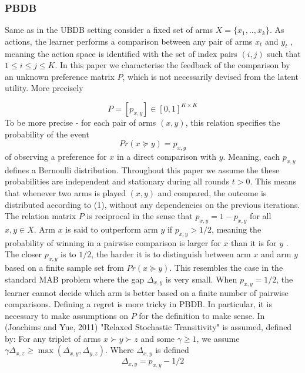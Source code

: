 \documentclass{llncs}
\begin{document}
	\subsubsection{PBDB}	
		Same as in the UBDB setting	consider a fixed set of arms $X = \{x_1,..,x_k\}$. 
		As actions, the learner performs a comparison between any pair of arms $x_t$ and $y_t$ , meaning the action space is identified with the set of index pairs $(i, j)$ such that $1 \leq i \leq j \leq K$. 
		In this paper we characterise the feedback of the comparison by an unknown preference matrix $P$, which is not necessarily devised from the latent utility.
		More precisely
		
		\begin{equation}\label{eq:preference_matrix}
			P = [p_{x,y}] \in [0,1]^{K \times K} 
		\end{equation}
		To be more precise - for each pair of arms $(x ,y)$, this relation specifies the probability of the event
		\begin{equation}\label{eq:p_xy}
			Pr(x \succeq y) = p_{x, y}
		\end{equation}
		of observing a preference for $x$ in a direct comparison with $y$. 
		Meaning, each $p_{x,y}$ defines a Bernoulli distribution.
		Throughout this paper we assume the these probabilities are independent and stationary during all rounds $t > 0$.		
		This means that whenever two arms is played $(x ,y)$ and compared, the outcome is distributed according to (1), without any dependencies on the previous iterations.
		The relation matrix $P$ is reciprocal in the sense that $p_{x,y} = 1-p_{x,y}$ for all $x,y \in X$.		
		Arm $x$ is said to outperform arm $y$ if $p_{x,y} > 1/2$, meaning the probability of winning in a pairwise comparison is larger for $x$ than it is for $y$ . 
		The closer $p_{x,y}$ is to $1/2$, the harder it is to distinguish between arm $x$ and arm $y$ based on a finite sample set from $Pr(x \succeq y)$. This resembles the case in the standard MAB problem where the gap $\Delta_{x,y}$ is very small.
		 When $p_{x,y} = 1/2$, the learner cannot decide which arm is better based on a finite number of pairwise comparisons.
		 Defining a regret is more tricky in PBDB. In particular, it is necessary to make assumptions on $P$ for the definition to make sense.
		 In (Joachims and Yue, 2011) "Relaxed Stochastic Transitivity" is assumed, defined by:
		 For any triplet of arms $x \succ y \succ z$ and some $ \gamma \geq 1 $, 
		 we assume $\gamma \Delta_{x,z} \geq \max(\Delta_{x,y},\Delta_{y,z})$.
		 Where $\Delta_{x,y}$ is defined
		 \begin{equation}\label{eq:delta}
		 	\Delta_{x,y} = p_{x,y} - 1/2
		 \end{equation}		 		 
\end{document}
